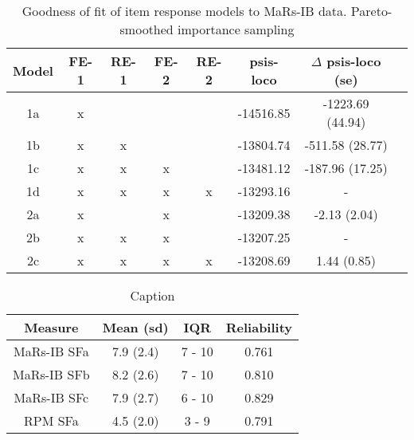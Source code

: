 \documentclass[a4paper,man,natbib]{apa6}
\begin{document}
\begin{table}
    \centering
    \begin{tabular}{c|c|c|c|c|c|c|c}
    \hline
    Model & FE-1 & RE-1 & FE-2 & RE-2 & psis-loco & $\Delta$ psis-loco (se) \\
    \hline
    1a & x &   &   &   & -14516.85 & -1223.69 (44.94)\\
    1b & x & x &   &   & -13804.74 & -511.58 (28.77) \\
    1c & x & x & x &   & -13481.12 & -187.96 (17.25) \\
    1d & x & x & x & x & -13293.16 & - \\
    \hline
    2a & x &   & x &   & -13209.38 & -2.13 (2.04) \\
    2b & x & x & x &   & -13207.25 & - \\
    2c & x & x & x & x & -13208.69 & 1.44 (0.85) \\
    \hline
    \end{tabular}
    \caption{\label{tab:1} Goodness of fit of item response models to MaRs-IB data. Pareto-smoothed importance sampling}
    \label{table:1}
\end{table}

\begin{table}
    \centering
    \begin{tabular}{c|c|c|c}
    Measure & Mean (sd) & IQR & Reliability \\
    \hline
    MaRs-IB SFa & 7.9 (2.4) & 7 - 10 & 0.761 \\
    MaRs-IB SFb & 8.2 (2.6) & 7 - 10 & 0.810 \\
    MaRs-IB SFc & 7.9 (2.7) & 6 - 10 & 0.829 \\
    RPM SFa & 4.5 (2.0) & 3 - 9 & 0.791 \\
    \end{tabular}
    \caption{Caption}
    \label{table:2}
\end{table}
\end{document}
